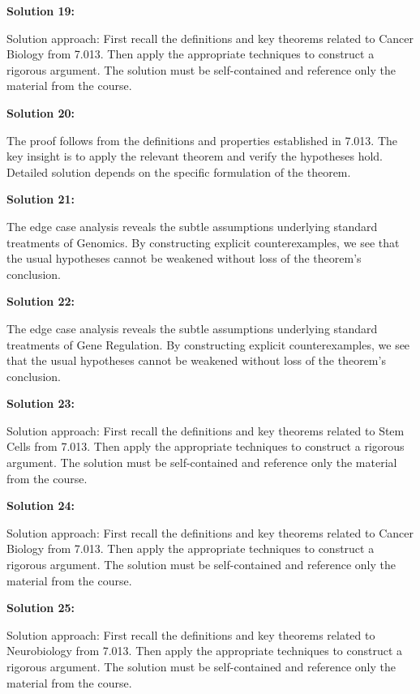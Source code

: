 \documentclass[12pt,a4paper]{exam}
\begin{document}
\vspace{0.5cm}

\textbf{Solution 19:}

Solution approach: First recall the definitions and key theorems related to Cancer Biology from 7.013. Then apply the appropriate techniques to construct a rigorous argument. The solution must be self-contained and reference only the material from the course.

\vspace{0.5cm}

\textbf{Solution 20:}

The proof follows from the definitions and properties established in 7.013. The key insight is to apply the relevant theorem and verify the hypotheses hold. Detailed solution depends on the specific formulation of the theorem.

\vspace{0.5cm}

\textbf{Solution 21:}

The edge case analysis reveals the subtle assumptions underlying standard treatments of Genomics. By constructing explicit counterexamples, we see that the usual hypotheses cannot be weakened without loss of the theorem's conclusion.

\vspace{0.5cm}

\textbf{Solution 22:}

The edge case analysis reveals the subtle assumptions underlying standard treatments of Gene Regulation. By constructing explicit counterexamples, we see that the usual hypotheses cannot be weakened without loss of the theorem's conclusion.

\vspace{0.5cm}

\textbf{Solution 23:}

Solution approach: First recall the definitions and key theorems related to Stem Cells from 7.013. Then apply the appropriate techniques to construct a rigorous argument. The solution must be self-contained and reference only the material from the course.

\vspace{0.5cm}

\textbf{Solution 24:}

Solution approach: First recall the definitions and key theorems related to Cancer Biology from 7.013. Then apply the appropriate techniques to construct a rigorous argument. The solution must be self-contained and reference only the material from the course.

\vspace{0.5cm}

\textbf{Solution 25:}

Solution approach: First recall the definitions and key theorems related to Neurobiology from 7.013. Then apply the appropriate techniques to construct a rigorous argument. The solution must be self-contained and reference only the material from the course.

\vspace{0.5cm}
\end{document}
